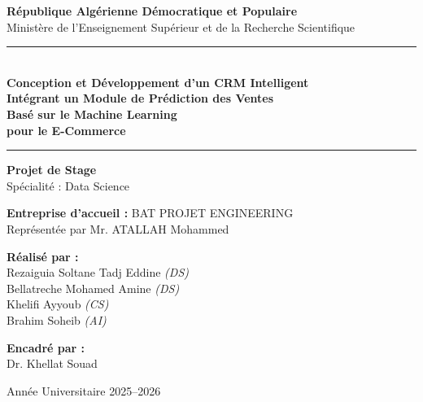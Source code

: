 \documentclass[12pt,a4paper]{report}
\begin{document}
\begin{titlepage}
\begin{center}

\vspace*{1cm}

{\Large \textbf{R\'{e}publique Alg\'{e}rienne D\'{e}mocratique et Populaire}}\\[0.3cm]
{\large Minist\`{e}re de l'Enseignement Sup\'{e}rieur et de la Recherche Scientifique}

\vspace{1.5cm}

\rule{\linewidth}{0.5pt}\\[0.5cm]
{\Huge \bfseries Conception et D\'{e}veloppement d'un CRM Intelligent}\\[0.3cm]
{\LARGE \bfseries Int\'{e}grant un Module de Pr\'{e}diction des Ventes}\\[0.2cm]
{\LARGE \bfseries Bas\'{e} sur le Machine Learning}\\[0.2cm]
{\Large \bfseries pour le E-Commerce}\\[0.3cm]
\rule{\linewidth}{0.5pt}

\vspace{1cm}

{\Large \textbf{Projet de Stage}}\\[0.3cm]
{\large Sp\'{e}cialit\'{e} : Data Science}

\vspace{1cm}

{\large \textbf{Entreprise d'accueil :} BAT PROJET ENGINEERING}\\[0.2cm]
{\large Repr\'{e}sent\'{e}e par Mr. ATALLAH Mohammed}

\vspace{1cm}

\begin{minipage}{0.45\textwidth}
\begin{flushleft}
{\large \textbf{R\'{e}alis\'{e} par :}}\\[0.3cm]
{\large Rezaiguia Soltane Tadj Eddine \textit{(DS)}}\\[0.15cm]
{\large Bellatreche Mohamed Amine \textit{(DS)}}\\[0.15cm]
{\large Khelifi Ayyoub \textit{(CS)}}\\[0.15cm]
{\large Brahim Soheib \textit{(AI)}}
\end{flushleft}
\end{minipage}
\hfill
\begin{minipage}{0.45\textwidth}
\begin{flushright}
{\large \textbf{Encadr\'{e} par :}}\\[0.3cm]
{\large Dr. Khellat Souad}
\end{flushright}
\end{minipage}

\vfill

{\large Ann\'{e}e Universitaire 2025--2026}

\end{center}
\end{titlepage}
\end{document}
